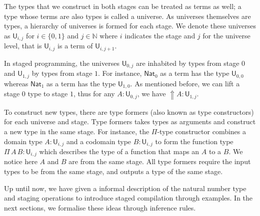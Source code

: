 
The types that we construct in both stages can be treated as terms as well; a type whose terms are also types is called a universe. As universes themselves are types, a hierarchy of universes is formed for each stage. We denote these universes as $\mathsf{U}_{i,j}$ for $i\in\{0,1\}$ and $j\in\mathbb N$ where $i$ indicates the stage and $j$ for the universe level, that is $\mathsf{U}_{i,j}$ is a term of $\mathsf{U}_{i,j+1}$. %

In staged programming, the universes $\mathsf{U}_{0,j}$ are inhabited by types from stage $0$ and $\mathsf{U}_{1,j}$ by types from stage $1$. For instance, $\mathsf{Nat}_0$ as a term has the type $\mathsf{U}_{0,0}$ whereas $\mathsf{Nat}_1$ as a term has the type $\mathsf{U}_{1,0}$. As mentioned before, we can lift a stage $0$ type to stage $1$, thus for any $A:\mathsf{U}_{0,j}$, we have ${\Uparrow}A:\mathsf{U}_{1,j}$.

To construct new types, there are type formers (also known as type constructors) for each universe and stage. Type formers takes types as arguments and construct a new type in the same stage. For instance, the $\Pi$-type constructor combines a domain type $A:\mathsf{U}_{i,j}$ and a codomain type $B:\mathsf{U}_{i,j}$ to form the function type $\Pi\,A\,B:\mathsf{U}_{i,j}$ which describes the type of a function that maps an $A$ to a $B$. We notice here $A$ and $B$ are from the same stage. All type formers require the input types to be from the same stage, and outputs a type of the same stage.
 


Up until now, we have given a informal description of the natural number type and staging operations to introduce staged compilation through examples. In the next sections, we formalise these ideas through inference rules.
